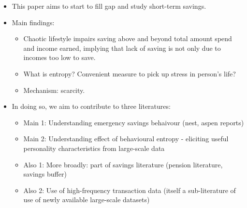 \begin{itemize}
    \item This paper aims to start to fill gap and study short-term savings.



    \item Main findings:

        \begin{itemize}
            \item Chaotic lifestyle impairs saving above and beyond total
                amount spend and income earned, implying that lack of saving is
                not only due to incomes too low to save.

            \item What is entropy? Convenient measure to pick up stress in
                person's life?

            \item Mechanism: scarcity.

        \end{itemize}

    \item In doing so, we aim to contribute to three literatures:

    \begin{itemize}
        \item Main 1: Understanding emergency savings behaivour (nest, aspen reports)

        \item Main 2: Understanding effect of behavioural entropy - eliciting
            useful personality characteristics from large-scale data

        \item Also 1: More broadly: part of savings literature (pension literature,
            savings buffer)

        \item Also 2: Use of high-frequency transaction data (itself a sub-literature of
            use of newly available large-scale datasets)
    \end{itemize}
\end{itemize}





